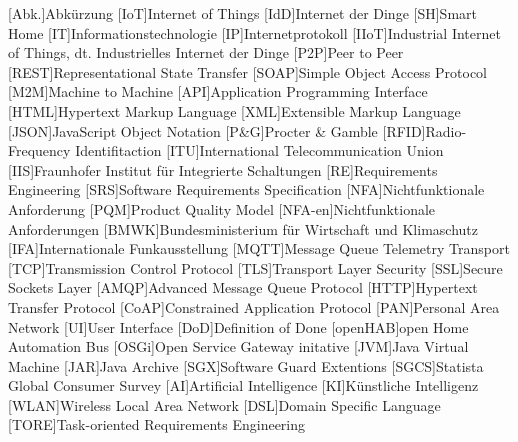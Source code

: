 \begin{acronym}[DHBW]
 [Abk.]{Abkürzung}
 [IoT]{Internet of Things}
 [IdD]{Internet der Dinge}
 [SH]{Smart Home}
 [IT]{Informationstechnologie}
 [IP]{Internetprotokoll}
 [IIoT]{Industrial Internet of Things, dt. Industrielles Internet der Dinge}
 [P2P]{Peer to Peer} 
 [REST]{Representational State Transfer}
 [SOAP]{Simple Object Access Protocol}
 [M2M]{Machine to Machine}
 [API]{Application Programming Interface}
 [HTML]{Hypertext Markup Language}
 [XML]{Extensible Markup Language}
 [JSON]{JavaScript Object Notation}
 [P\&G]{Procter \& Gamble}
 [RFID]{Radio-Frequency Identifitaction}
 [ITU]{International Telecommunication Union}
 [IIS]{Fraunhofer Institut für Integrierte Schaltungen}
 [RE]{Requirements Engineering}
 [SRS]{Software Requirements Specification}
 [NFA]{Nichtfunktionale Anforderung}
 [PQM]{Product Quality Model}
 [NFA-en]{Nichtfunktionale Anforderungen}
 [BMWK]{Bundesministerium für Wirtschaft und Klimaschutz}
 [IFA]{Internationale Funkausstellung}
 [MQTT]{Message Queue Telemetry Transport}
 [TCP]{Transmission Control Protocol}
 [TLS]{Transport Layer Security}
 [SSL]{Secure Sockets Layer}
 [AMQP]{Advanced Message Queue Protocol} 
 [HTTP]{Hypertext Transfer Protocol}
 [CoAP]{Constrained Application Protocol}
 [PAN]{Personal Area Network} 
 [UI]{User Interface}
 [DoD]{Definition of Done}
 [openHAB]{open Home Automation Bus}
 [OSGi]{Open Service Gateway initative}
 [JVM]{Java Virtual Machine}
 [JAR]{Java Archive}
 [SGX]{Software Guard Extentions}
 [SGCS]{Statista Global Consumer Survey}
 [AI]{Artificial Intelligence}
 [KI]{Künstliche Intelligenz}
 [WLAN]{Wireless Local Area Network} 
 [DSL]{Domain Specific Language}
 [TORE]{Task-oriented Requirements Engineering}




\end{acronym}
